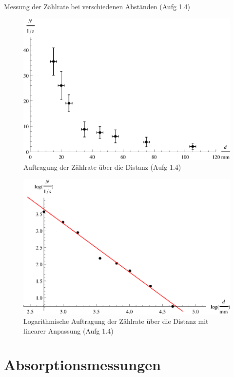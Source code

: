 \begin{table}[p]
\centering
\caption{Messung der Zählrate bei verschiedenen Abständen (Aufg 1.4)}
\label{tab:iii_1p4}

\end{table}

\begin{figure}[p]
\centering
\includegraphics[scale=0.9]{fig/iii_1p4_error.eps}
\caption{Auftragung der Zählrate über die Distanz (Aufg 1.4)}
\label{fig:iii_1p4_error}
\end{figure}

\begin{figure}[p]
\centering
\includegraphics[scale=1.0]{fig/iii_1p4_log.eps}
\caption{Logarithmische Auftragung der Zählrate über die Distanz mit linearer Anpassung (Aufg 1.4)}
\label{fig:iii_1p4_log}
\end{figure}

\section{Absorptionsmessungen}
